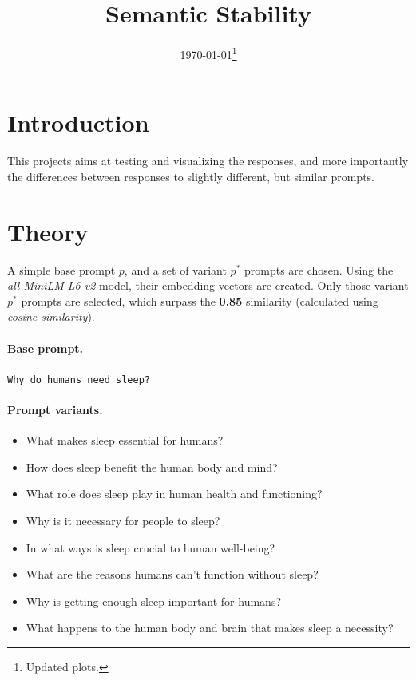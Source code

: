 \documentclass{article}
\title{Semantic Stability}
\begin{document}
\date{\today\thanks{Updated plots.}}

\maketitle 


\section{Introduction}
This projects aims at testing and visualizing the responses, and more importantly the differences between responses to slightly different, but similar prompts.

\section{Theory}
A simple base prompt $p$, and a set of variant $p^*$ prompts are chosen. Using the \textit{all-MiniLM-L6-v2} model, their embedding vectors are created. Only those variant $p^*$ prompts are selected, which surpass the \textbf{0.85} similarity (calculated using \textit{cosine similarity}).

\paragraph{Base prompt.}
\texttt{Why do humans need sleep?}

\paragraph{Prompt variants.}
\begin{itemize}
    \item What makes sleep essential for humans?
    \item How does sleep benefit the human body and mind?
    \item What role does sleep play in human health and functioning?
    \item Why is it necessary for people to sleep?
    \item In what ways is sleep crucial to human well-being?
    \item What are the reasons humans can't function without sleep?
    \item Why is getting enough sleep important for humans?
    \item What happens to the human body and brain that makes sleep a necessity?
\end{itemize}
\end{document}
